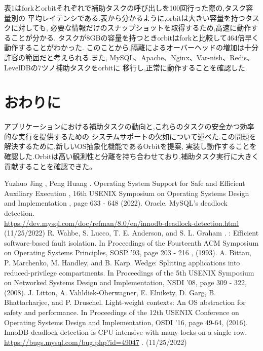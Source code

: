 \documentclass[submit,techreq,noauthor]{eco}	%
\begin{document}
  表1はforkとorbitそれぞれで補助タスクの呼び出しを100回行った際の,タスク容量別の
  平均レイテンシである.表から分かるように,orbitは大きい容量を持つタスクに対しても,
  必要な情報だけのスナップショットを取得するため,高速に動作することが分かる.
  タスクが8GBの容量を持つときorbitはforkと比較して464倍早く動作することがわかった.
  このことから,隔離によるオーバーヘッドの増加は十分許容の範囲だと考えられる.また,
  MySQL、Apache、Nginx、Var-nish、Redis、LevelDBの7ツノ補助タスクをorbitに
  移行し,正常に動作することを確認した.

\section{おわりに}
アプリケーションにおける補助タスクの動向と,これらのタスクの安全かつ効率的な実行を提供するための
システムサポートの欠如について述べた.この問題を解決するために,新しいOS抽象化機能であるOrbitを提案,
実装し動作することを確認した.Orbitは高い観測性と分離を持ち合わせており,補助タスク実行に大きく
貢献することを確認できた。

\begin{thebibliography}{99}
   Yuzhuo Jing , Peng Huang . Operating System 
  Support for Safe and Efficient Auxiliary Execution , 16th 
  USENIX Symposium on Operating Systems Design and Implementation ,
   page 633 - 648 (2022).
   Oracle. MySQL's deadlock detection.\\
  \url{https://dev.mysql.com/doc/refman/8.0/en/innodb-deadlock-detection.html}
  (11/25/2022)
   R. Wahbe, S. Lucco, T. E. Anderson, and S. L. Graham .
  : Efficient software-based fault isolation. In Proceedings of the 
  Fourteenth ACM Symposium on Operating Systems Principles, SOSP '93,
   page 203 - 216 , (1993).
  A. Bittau, P. Marchenko, M. Handley, and B. Karp. 
  Wedge: Splitting applications into reduced-privilege compartments.
   In Proceedings of the 5th USENIX Symposium on Networked Systems 
   Design and Implementation, NSDI '08, page 309 - 322, (2008).
  J. Litton, A. Vahldiek-Oberwagner, E. Elnikety, D. 
  Garg, B. Bhattacharjee, and P. Druschel. Light-weight contexts: 
  An OS abstraction for safety and performance. In Proceedings of
  the 12th USENIX Conference on Operating Systems Design and Implementation,
   OSDI '16, page 49-64, (2016).
  InnoDB deadlock detection is CPU intensive with many locks on a single row.
    \url{https://bugs.mysql.com/bug.php?id=49047} . (11/25/2022)
\end{thebibliography}
\end{document}
